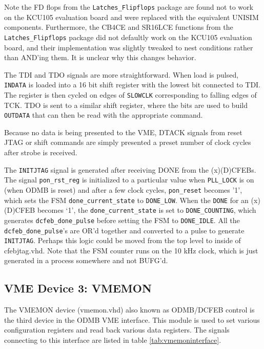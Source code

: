 \documentclass[10pt,a4paper]{article}
\begin{document}
Note the FD flops from the \texttt{Latches\_Flipflops} package are found not to work on the KCU105 evaluation board and were replaced with the equivalent UNISIM components. Furthermore, the CB4CE and SR16LCE functions from the \texttt{Latches\_Flipflops} package did not defaultly work on the KCU105 evaluation board, and their implementation was slightly tweaked to nest conditions rather than AND'ing them. It is unclear why this changes behavior.

The TDI and TDO signals are more straightforward. When load is pulsed, \texttt{INDATA} is loaded into a 16 bit shift register with the lowest bit connected to TDI. The register is then cycled on edges of \texttt{SLOWCLK} corresponding to falling edges of TCK. TDO is sent to a similar shift register, where the bits are used to build \texttt{OUTDATA} that can then be read with the appropriate command.

Because no data is being presented to the VME, DTACK signals from reset JTAG or shift commands are simply presented a preset number of clock cycles after strobe is received.

The \texttt{INITJTAG} signal is generated after receiving DONE from the (x)(D)CFEBs. The signal \texttt{pon\_rst\_reg} is initialized to a particular value when \texttt{PLL\_LOCK} is on (when ODMB is reset) and after a few clock cycles, \texttt{pon\_reset} becomes '1', which sets the FSM \texttt{done\_current\_state} to \texttt{DONE\_LOW}. When the \texttt{DONE} for an (x)(D)CFEB becomes `1', the \texttt{done\_current\_state} is set to \texttt{DONE\_COUNTING}, which generates \texttt{dcfeb\_done\_pulse} before setting the FSM to \texttt{DONE\_IDLE}. All the \texttt{dcfeb\_done\_pulse}'s are OR'd together and converted to a pulse to generate \texttt{INITJTAG}. Perhaps this logic could be moved from the top level to inside of cfebjtag.vhd. Note that the FSM counter runs on the 10 kHz clock, which is just generated in a process somewhere and not BUFG'd. 

\subsection{VME Device 3: VMEMON}

The VMEMON device (vmemon.vhd) also known as ODMB/DCFEB control is the third device in the ODMB VME interface. This module is used to set various configuration registers and read back various data registers. The signals connecting to this interface are listed in table \ref{tab:vmemoninterface}.
\end{document}
